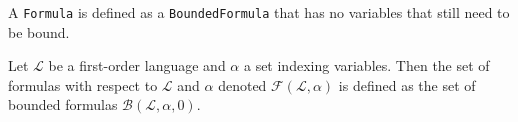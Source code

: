 
A \texttt{Formula} is defined as a \texttt{BoundedFormula} that has no variables that still need to be bound.

\begin{definition}[Formula]\label{def:formula}
    \leanok
    Let $\mathcal{L}$ be a first-order language and $\alpha$ a set indexing variables. Then the set of formulas with respect to $\mathcal{L}$ and $\alpha$ denoted $\mathcal{F}(\mathcal{L},\alpha)$ is defined as the set of bounded formulas $\mathcal{B}(\mathcal{L},\alpha,0)$.
\end{definition}

